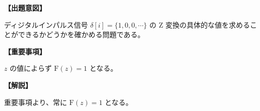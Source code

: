 \noindent \textbf{【出題意図】}

\bigskip
\noindent ディジタルインパルス信号 $\delta[i] = \{1,0,0,\cdots \}$ の Z 変換の具体的な値を求めることができるかどうかを確かめる問題である。

\vspace{1em}
\noindent \textbf{【重要事項】}

\medskip
$z$ の値によらず $\textrm{F}(z) = 1$ となる。

\bigskip

\vspace{1em}
\noindent \textbf{【解説】}

\bigskip
\noindent 重要事項より、常に $\textrm{F}(z) = 1$ となる。
